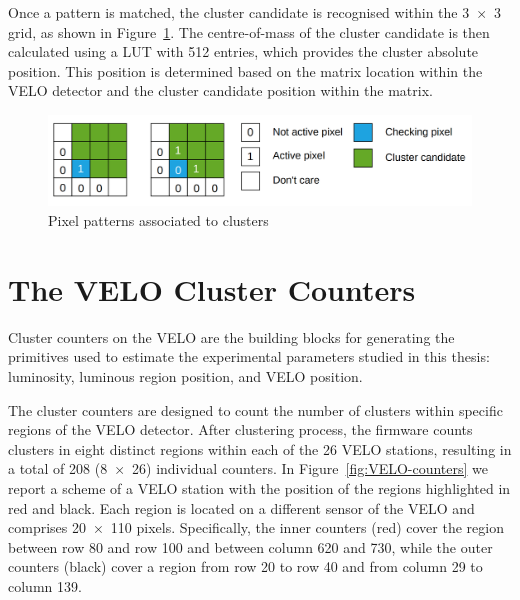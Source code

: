 Once a pattern is matched, the cluster candidate is recognised within the 3~×~3 grid, as shown in Figure~\ref{fig:cluster_recognition}. The centre-of-mass of the cluster candidate is then calculated using a LUT with 512 entries, which provides the cluster absolute position. This position is determined based on the matrix location within the VELO detector and the cluster candidate position within the matrix.

\begin{figure}
    \centering
    \includegraphics[width=\textwidth]{figures/cluster_recognition.png}
    \caption{Pixel patterns associated to clusters}
    \label{fig:cluster_recognition}
\end{figure}

\section{The VELO Cluster Counters}\label{sec:velo_counters}
Cluster counters on the VELO are the building blocks for generating the primitives used to estimate the experimental parameters studied in this thesis: luminosity, luminous region position, and VELO position. 

The cluster counters are designed to count the number of clusters within specific regions of the VELO detector. After clustering process, the firmware counts clusters in eight distinct regions within each of the 26 VELO stations, resulting in a total of 208 (8~×~26) individual counters. In Figure~\ref{fig:VELO-counters} we report a scheme of a VELO station with the position of the regions highlighted in red and black. Each region is located on a different sensor of the VELO and comprises 20~×~110 pixels. Specifically, the inner counters (red) cover the region between row 80 and row 100 and between column 620 and 730, while the outer counters (black) cover a region from row 20 to row 40 and from column 29 to column 139. 


